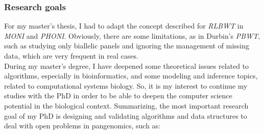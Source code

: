 \documentclass[a4paper,11pt, oneside]{article}
\begin{document}
\subsubsection*{Research goals}
For my master's thesis, I had to adapt the concept described for
\textit{RLBWT} in \textit{MONI} and \textit{PHONI}. 
Obviously, there are some limitations, as in Durbin's \textit{PBWT}, such as
studying only biallelic panels and ignoring the management of missing data,
which are very frequent in real cases. \\
During my master’s degree, I have deepened some theoretical
issues related to algorithms, especially in bioinformatics, and
some modeling and inference topics, related to computational 
systems biology. So, it is my interest to continue my studies with the PhD
in order to be able to deepen the computer science potential in the biological
context.
Summarizing, the most important research goal of my PhD is designing and
validating algorithms and data structures to deal with open problems in
pangenomics, such as: 
\vspace{-1.25mm}
\end{document}
